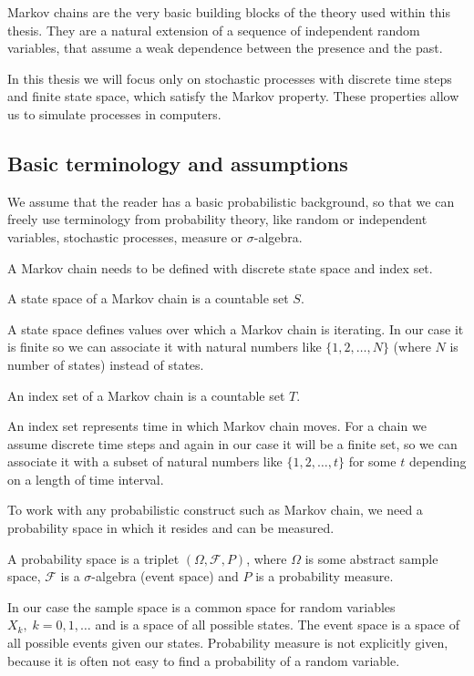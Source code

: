 Markov chains are the very basic building blocks of the theory used within this thesis. They are a natural extension of a sequence of independent random variables, that assume a weak dependence between the presence and the past.

In this thesis we will focus only on stochastic processes  with discrete time steps and finite state space, which satisfy the Markov property. These properties allow us to simulate processes in computers.

\subsection{Basic terminology and assumptions}
	We assume that the reader has a basic probabilistic background, so that we can freely use terminology from probability theory, like random or independent variables, stochastic processes, measure or $\sigma$-algebra.
	
	A Markov chain needs to be defined with discrete state space and index set.
	\begin{definition}
		A state space of a Markov chain is a countable set $S$.
	\end{definition}
	A state space defines values over which a Markov chain is iterating. In our case it is finite so we can associate it with natural numbers like $\{1, 2, \ldots, N\}$ (where $N$ is number of states) instead of states.
	
	\begin{definition}
		An index set of a Markov chain is a countable set $T$.
	\end{definition}
	An index set represents time in which Markov chain moves. For a chain we assume discrete time steps and again in our case it will be a finite set, so we can associate it with a subset of natural numbers like $\{1, 2, \ldots, t\}$ for some $t$ depending on a length of time interval.
	
	To work with any probabilistic construct such as Markov chain, we need a probability space in which it resides and can be measured.
	\begin{definition}
		A probability space is a triplet $\left( \Omega, \mathcal{F}, P \right)$, where $\Omega$ is some abstract sample space, $\mathcal{F}$ is a $\sigma$-algebra (event space) and $P$ is a probability measure.
	\end{definition}
	In our case the sample space is a common space for random variables $X_k, \; k=0,1,\ldots$ and is a space of all possible states. The event space is a space of all possible events given our states. Probability measure is not explicitly given, because it is often not easy to find a probability of a random variable.
	
